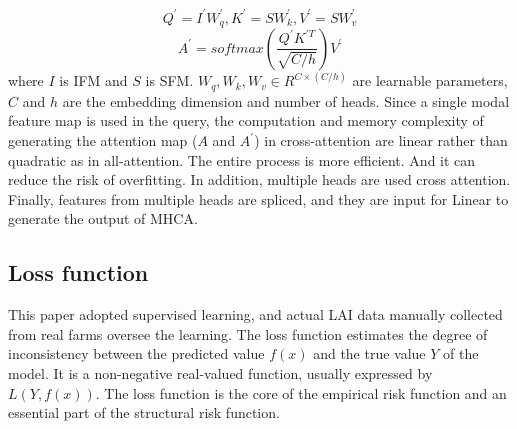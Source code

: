 \documentclass[acmsmall,manuscript, screen, review]{acmart}
\begin{document}
\begin{equation}
  Q^\prime=I^\prime W_q^\prime,K^\prime=SW_k^\prime,V^\prime=SW_v^\prime
\end{equation}
\begin{equation}
  A^\prime=softmax\left(\frac{Q^\prime K^{\prime T}}{\sqrt{C/h}}\right)V^\prime
\end{equation}
where \begin{math}
  I
\end{math} is IFM and \begin{math}
  S
\end{math} is SFM. \begin{math}
  W_q,W_k,W_v\in R^{C\times\left(C/h\right)}
\end{math} are learnable parameters, \begin{math}
  C
\end{math} and \begin{math}
  h
\end{math} are the embedding dimension and number of heads.  Since a single modal feature map is used in the query, the computation and memory complexity of generating the attention map (\begin{math}
  A
\end{math} and \begin{math}
  A^\prime
\end{math}) in cross-attention are linear rather than quadratic as in all-attention. The entire process is more efficient. And it can reduce the risk of overfitting. In addition, multiple heads are used cross attention. Finally, features from multiple heads are spliced, and they are input for Linear to generate the output of MHCA.

\subsection{Loss function}
This paper adopted supervised learning, and actual LAI data manually collected from real farms oversee the learning. The loss function estimates the degree of inconsistency between the predicted value \begin{math}
  f(x)
\end{math} and the true value \begin{math}
  Y
\end{math} of the model. It is a non-negative real-valued function, usually expressed by \begin{math}
  L(Y, f(x))
\end{math}. The loss function is the core of the empirical risk function and an essential part of the structural risk function. 
\end{document}
